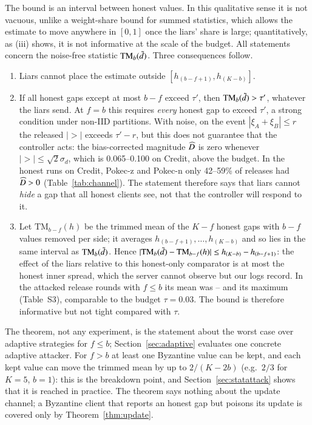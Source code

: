 The bound is an interval between honest values. In this qualitative sense it is not vacuous, unlike a weight-share bound for summed statistics, which allows the estimate to move anywhere in $[0,1]$ once the liars' share is large; quantitatively, as (iii) shows, it is not informative at the scale of the budget. All statements concern the noise-free statistic $\mathrm{TM}_b(\tilde d)$. Three consequences follow.
\begin{enumerate}
\item[(i)] Liars cannot place the estimate outside $[h_{(b-f+1)},h_{(K-b)}]$.
\item[(ii)] If all honest gaps except at most $b-f$ exceed $\tau'$, then $\mathrm{TM}_b(\tilde d)>\tau'$, whatever the liars send. At $f=b$ this requires \emph{every} honest gap to exceed $\tau'$, a strong condition under non-IID partitions. With noise, on the event $|\xi_A+\xi_B|\le r$ the released $|\gt|$ exceeds $\tau'-r$, but this does not guarantee that the controller acts: the bias-corrected magnitude $\widehat{D}$ is zero whenever $|\gt|\le\sqrt2\sigma_d$, which is 0.065--0.100 on Credit, above the budget. In the honest runs on Credit, Pokec-z and Pokec-n only 42--59\% of releases had $\widehat{D}>0$ (Table~\ref{tab:channel}). The statement therefore says that liars cannot \emph{hide} a gap that all honest clients see, not that the controller will respond to it.
\item[(iii)] Let $\mathrm{TM}_{b-f}(h)$ be the trimmed mean of the $K-f$ honest gaps with $b-f$ values removed per side; it averages $h_{(b-f+1)},\dots,h_{(K-b)}$ and so lies in the same interval as $\mathrm{TM}_b(\tilde d)$. Hence $|\mathrm{TM}_b(\tilde d)-\mathrm{TM}_{b-f}(h)|\le h_{(K-b)}-h_{(b-f+1)}$: the effect of the liars relative to this honest-only comparator is at most the honest inner spread, which the server cannot observe but our logs record. In the attacked release rounds with $f\le b$ its mean was \spreadMin--\spreadMax{} and its maximum \spreadMaxAll{} (Table~S3), comparable to the budget $\tau=0.03$. The bound is therefore informative but not tight compared with $\tau$.
\end{enumerate}
The theorem, not any experiment, is the statement about the worst case over adaptive strategies for $f\le b$; Section~\ref{sec:adaptive} evaluates one concrete adaptive attacker. For $f>b$ at least one Byzantine value can be kept, and each kept value can move the trimmed mean by up to $2/(K-2b)$ (e.g.\ $2/3$ for $K=5$, $b=1$): this is the breakdown point, and Section~\ref{sec:statattack} shows that it is reached in practice. The theorem says nothing about the update channel; a Byzantine client that reports an honest gap but poisons its update is covered only by Theorem~\ref{thm:update}.


